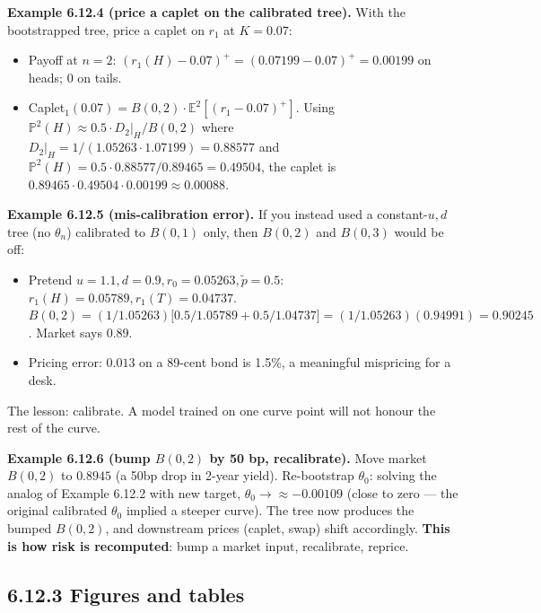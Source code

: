 \documentclass[
  10pt,
  twoside]{book}
\providecommand{\tightlist}{%
  \setlength{\itemsep}{0pt}\setlength{\parskip}{0pt}}
\begin{document}
\textbf{Example 6.12.4 (price a caplet on the calibrated tree).} With
the bootstrapped tree, price a caplet on \(r_1\) at \(K = 0.07\):

\begin{itemize}
\tightlist
\item
  Payoff at \(n = 2\):
  \((r_1(H) - 0.07)^+ = (0.07199 - 0.07)^+ = 0.00199\) on heads; \(0\)
  on tails.
\item
  Caplet\(_1(0.07) = B(0, 2) \cdot \mathbb E^2[(r_1 - 0.07)^+]\). Using
  \(\mathbb P^2(H) \approx 0.5 \cdot D_2|_H/B(0,2)\) where
  \(D_2|_H = 1/(1.05263 \cdot 1.07199) = 0.88577\) and
  \(\mathbb P^2(H) = 0.5 \cdot 0.88577 / 0.89465 = 0.49504\), the caplet
  is \(0.89465 \cdot 0.49504 \cdot 0.00199 \approx 0.00088\).
\end{itemize}

\textbf{Example 6.12.5 (mis-calibration error).} If you instead used a
constant-\(u, d\) tree (no \(\theta_n\)) calibrated to \(B(0, 1)\) only,
then \(B(0, 2)\) and \(B(0, 3)\) would be off:

\begin{itemize}
\tightlist
\item
  Pretend \(u = 1.1, d = 0.9, r_0 = 0.05263, \tilde p = 0.5\):
  \(r_1(H) = 0.05789, r_1(T) = 0.04737\).
  \(B(0, 2) = (1/1.05263)\bigl[0.5/1.05789 + 0.5/1.04737\bigr] = (1/1.05263)(0.94991) = 0.90245\).
  Market says \(0.89\).
\item
  Pricing error: \(0.013\) on a 89-cent bond is 1.5\%, a meaningful
  mispricing for a desk.
\end{itemize}

The lesson: calibrate. A model trained on one curve point will not
honour the rest of the curve.

\textbf{Example 6.12.6 (bump \(B(0, 2)\) by 50 bp, recalibrate).} Move
market \(B(0, 2)\) to \(0.8945\) (a 50bp drop in 2-year yield).
Re-bootstrap \(\theta_0\): solving the analog of Example 6.12.2 with new
target, \(\theta_0 \to \approx -0.00109\) (close to zero --- the
original calibrated \(\theta_0\) implied a steeper curve). The tree now
produces the bumped \(B(0, 2)\), and downstream prices (caplet, swap)
shift accordingly. \textbf{This is how risk is recomputed}: bump a
market input, recalibrate, reprice.

\subsection{6.12.3 Figures and tables}\label{figures-and-tables-10}
\end{document}

